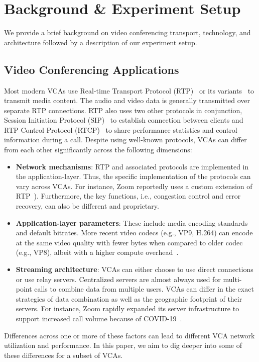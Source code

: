 \section{Background \& Experiment Setup}
\label{sec:background}

We provide a brief background on video conferencing transport, technology, and
architecture followed by a description of our experiment setup.

\subsection{Video Conferencing Applications}

Most modern VCAs use Real-time Transport Protocol (RTP)~\cite{schulzrinne1996rtp, schulzrinne2003rfc3550} or its variants~\cite{baugher2004secure, zoom_rtp} to
transmit media content. The audio and video data is generally transmitted over
separate RTP connections. RTP also uses two other protocols in conjunction,
Session Initiation Protocol (SIP)~\cite{rosenberg2002sip} to establish
connection between clients and RTP Control Protocol
(RTCP)~\cite{schulzrinne2003rfc3550} to share performance statistics and
control information during a call. Despite using well-known protocols, VCAs
can differ from each other significantly across the following dimensions:


\begin{itemize}
    \itemsep=-1pt
    \item \textbf{Network mechanisms}: RTP and  associated protocols are
        implemented in the application-layer. Thus, the specific
        implementation of the protocols can vary across VCAs. For instance,
        Zoom reportedly uses a custom extension of RTP~\cite{zoom_rtp}).
        Furthermore, the key  functions, i.e., congestion control and
        error recovery, can also be different and proprietary. 

    \item \textbf{Application-layer parameters}: These include media encoding
        standards and default bitrates. More recent video codecs (e.g., VP9,
        H.264) can encode at the same video quality with fewer bytes when
        compared to older codec (e.g., VP8), albeit with a higher compute
        overhead~\cite{bienik2016performance}. 
    
    \item \textbf{Streaming architecture}: VCAs can either choose to use
        direct connections or use relay servers. Centralized servers are
        almost always used for multi-point calls to combine data from multiple
        users. VCAs can differ in the exact strategies of data combination as
        well as the geographic footprint of their servers. For instance, Zoom
        rapidly expanded its server infrastructure to support increased call
        volume because of COVID-19~\cite{liu2020characterizing}. 

\end{itemize}
\noindent
Differences across one or more of these factors can lead to different VCA
network utilization and performance. In this paper, we aim to dig deeper into
some of these differences for a subset of VCAs. 



